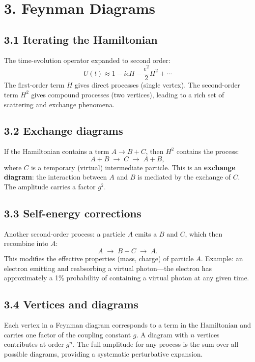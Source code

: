 \documentclass[12pt,a4paper]{article}
\begin{document}
\section{3. Feynman Diagrams}

\subsection{3.1 Iterating the Hamiltonian}

The time-evolution operator expanded to second order:
\[
    U(t) \approx 1 - i\epsilon H - \frac{\epsilon^2}{2}H^2 + \cdots
\]
The first-order term $H$ gives direct processes (single vertex).  The second-order term $H^2$ gives compound processes (two vertices), leading to a rich set of scattering and exchange phenomena.

\subsection{3.2 Exchange diagrams}

If the Hamiltonian contains a term $A \to B + C$, then $H^2$ contains the process:
\[
    A + B \;\longrightarrow\; C \;\longrightarrow\; A + B,
\]
where $C$ is a temporary (virtual) intermediate particle.  This is an \textbf{exchange diagram}: the interaction between $A$ and $B$ is mediated by the exchange of $C$.  The amplitude carries a factor $g^2$.

\subsection{3.3 Self-energy corrections}

Another second-order process: a particle $A$ emits a $B$ and $C$, which then recombine into $A$:
\[
    A \;\longrightarrow\; B + C \;\longrightarrow\; A.
\]
This modifies the effective properties (mass, charge) of particle $A$.  Example: an electron emitting and reabsorbing a virtual photon---the electron has approximately a 1\% probability of containing a virtual photon at any given time.

\subsection{3.4 Vertices and diagrams}

Each vertex in a Feynman diagram corresponds to a term in the Hamiltonian and carries one factor of the coupling constant $g$.  A diagram with $n$ vertices contributes at order $g^n$.  The full amplitude for any process is the sum over all possible diagrams, providing a systematic perturbative expansion.
\end{document}
